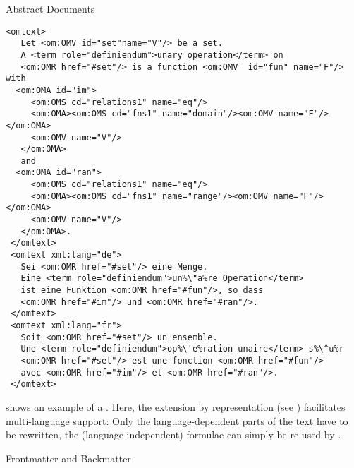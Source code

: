 \begin{omgroup}[id=omdoc-infrastructure,short=Document Infrastructure]
\begin{module}[id=docalt]
\begin{omgroup}{Abstract Documents}
\begin{example}
\begin{lstlisting}[escapechar=\%,label=lst:multiling,mathescape,
  caption={A Multilingual Group of \element{CMP} Elements},
  index={trl,xml:lang}]
 <omtext>
   Let <om:OMV id="set"name="V"/> be a set. 
   A <term role="definiendum">unary operation</term> on 
   <om:OMR href="#set"/> is a function <om:OMV  id="fun" name="F"/> with
  <om:OMA id="im">
     <om:OMS cd="relations1" name="eq"/>
     <om:OMA><om:OMS cd="fns1" name="domain"/><om:OMV name="F"/></om:OMA>
     <om:OMV name="V"/>
   </om:OMA>
   and 
  <om:OMA id="ran">
     <om:OMS cd="relations1" name="eq"/>
     <om:OMA><om:OMS cd="fns1" name="range"/><om:OMV name="F"/></om:OMA>
     <om:OMV name="V"/>
   </om:OMA>.
 </omtext>
 <omtext xml:lang="de">
   Sei <om:OMR href="#set"/> eine Menge. 
   Eine <term role="definiendum">un%\"a%re Operation</term> 
   ist eine Funktion <om:OMR href="#fun"/>, so dass
   <om:OMR href="#im"/> und <om:OMR href="#ran"/>.
 </omtext>
 <omtext xml:lang="fr">
   Soit <om:OMR href="#set"/> un ensemble. 
   Une <term role="definiendum">op%\'e%ration unaire</term> s%\^u%r
   <om:OMR href="#set"/> est une fonction <om:OMR href="#fun"/> 
   avec <om:OMR href="#im"/> et <om:OMR href="#ran"/>.
 </omtext>
\end{lstlisting}

  {} shows an example of a {}. Here, the
  {\openmath} extension by {} representation (see {})
  facilitates multi-language support: Only the language-dependent parts of the text have
  to be rewritten, the (language-independent) formulae can simply be re-used by
  .
\end{example}
\end{omgroup}
\begin{omgroup}[id=docmatter]{Frontmatter and Backmatter}
\end{omgroup}
\end{module}
\end{omgroup}

